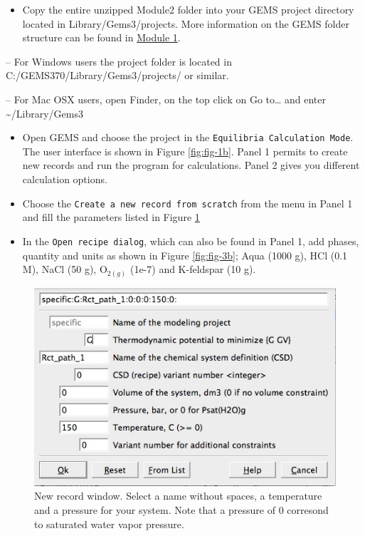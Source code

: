 \documentclass[
]{book}
\providecommand{\tightlist}{%
  \setlength{\itemsep}{0pt}\setlength{\parskip}{0pt}}
\begin{document}
\begin{itemize}
\tightlist
\item
  Copy the entire unzipped Module2 folder into your GEMS project directory located in Library/Gems3/projects. More information on the GEMS folder structure can be found in \protect\hyperlink{intro}{Module 1}.
\end{itemize}

-- For Windows users the project folder is located in C:/GEMS370/Library/Gems3/projects/ or similar.

-- For Mac OSX users, open Finder, on the top click on Go to\ldots{} and enter \textasciitilde/Library/Gems3

\begin{itemize}
\item
  Open GEMS and choose the project in the \texttt{Equilibria\ Calculation\ Mode}. The user interface is shown in Figure \ref{fig:fig-1b}. Panel 1 permits to create new records and run the program for calculations. Panel 2 gives you different calculation options.
\item
  Choose the \texttt{Create\ a\ new\ record\ from\ scratch} from the menu in Panel 1 and fill the parameters listed in Figure \ref{fig:fig-2b}
\item
  In the \texttt{Open\ recipe\ dialog}, which can also be found in Panel 1, add phases, quantity and units as shown in Figure \ref{fig:fig-3b}; Aqua (1000 g), HCl (0.1 M), NaCl (50 g), O\(_{2(g)}\) (1e-7) and K-feldspar (10 g).
\end{itemize}

\begin{figure}
\includegraphics[width=0.7\linewidth]{figures/module2/fig-2} \caption{New record window. Select a name without spaces, a temperature and a pressure for your system. Note that a pressure of 0 corresond to saturated water vapor pressure.}\label{fig:fig-2b}
\end{figure}
\end{document}
